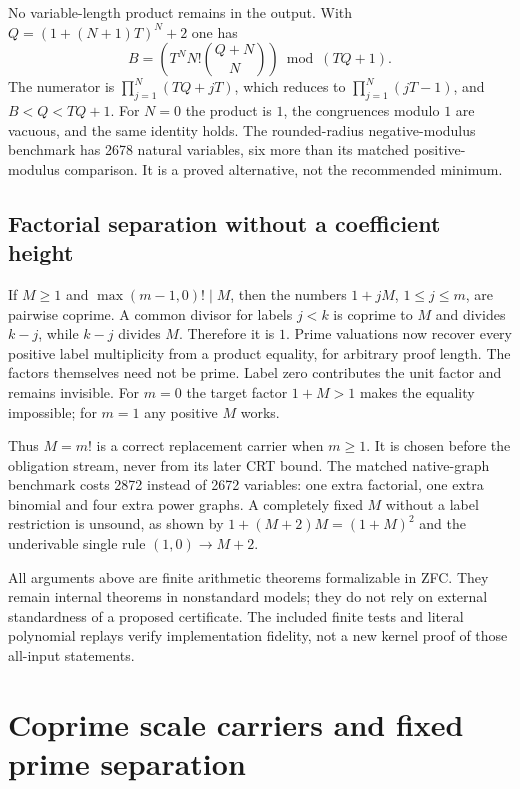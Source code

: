 \documentclass[11pt]{article}
\begin{document}
No variable-length product remains in the output. With
$Q=(1+(N+1)T)^N+2$ one has
\[
 B=\left(T^N N!\binom{Q+N}{N}\right)\bmod(TQ+1).
\]
The numerator is $\prod_{j=1}^N(TQ+jT)$, which reduces to
$\prod_{j=1}^N(jT-1)$, and $B<Q<TQ+1$. For $N=0$ the product is
$1$, the congruences modulo $1$ are vacuous, and the same identity holds.
The rounded-radius negative-modulus benchmark has 2678 natural variables,
six more than its matched positive-modulus comparison. It is a proved
alternative, not the recommended minimum.

\subsection{Factorial separation without a coefficient height}

If $M\ge1$ and $\max(m-1,0)!\mid M$, then the numbers
$1+jM$, $1\le j\le m$, are pairwise coprime. A common divisor for
labels $j<k$ is coprime to $M$ and divides $k-j$, while $k-j$ divides
$M$. Therefore it is $1$. Prime valuations now recover every positive
label multiplicity from a product equality, for arbitrary proof length.
The factors themselves need not be prime. Label zero contributes the
unit factor and remains invisible. For $m=0$ the target factor $1+M>1$
makes the equality impossible; for $m=1$ any positive $M$ works.

Thus $M=m!$ is a correct replacement carrier when $m\ge1$. It is
chosen before the obligation stream, never from its later CRT bound.
The matched native-graph benchmark costs 2872 instead of 2672 variables:
one extra factorial, one extra binomial and four extra power graphs.
A completely fixed $M$ without a label restriction is unsound, as shown by
$1+(M+2)M=(1+M)^2$ and the underivable single rule $(1,0)\to M+2$.

All arguments above are finite arithmetic theorems formalizable in ZFC.
They remain internal theorems in nonstandard models; they do not rely on
external standardness of a proposed certificate. The included finite tests
and literal polynomial replays verify implementation fidelity, not a new
kernel proof of those all-input statements.

\section{Coprime scale carriers and fixed prime separation}
\label{sec:r13-radicals}
\end{document}
